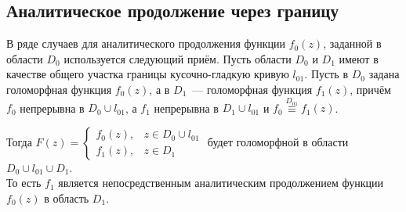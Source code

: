 \documentclass[a4paper, 12pt]{article}
\begin{document}
\subsection{Аналитическое продолжение через границу}
В ряде случаев для аналитического продолжения функции $f_0(z)$, заданной в области $D_0$ используется следующий приём. Пусть области $D_0$ и $D_1$ имеют в качестве общего участка границы кусочно-гладкую кривую $l_{01}$.
Пусть в $D_0$ задана голоморфная функция $f_0(z)$, а в $D_1$~--- голоморфная функция $f_1(z)$, причём $f_0$ непрерывна в $D_0 \cup l_{01}$, а $f_1$ непрерывна в $D_1 \cup l_{01}$ и $f_0 \overset{D_{01}}{\equiv} f_1(z)$.

Тогда $\displaystyle F(z) = 
\begin{cases}
    f_0(z), & z \in D_0 \cup l_{01} \\
    f_1(z), & z \in D_1
\end{cases}$
\quad будет голоморфной в области $D_0 \cup l_{01} \cup D_1$. \\
То есть $f_1$ является непосредственным аналитическим продолжением функции $f_0(z)$ в область $D_1$.
\end{document}
